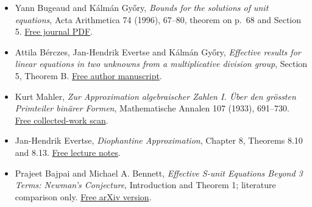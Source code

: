 \documentclass[
  11pt,
  a4paper,
]{article}
\providecommand{\tightlist}{%
  \setlength{\itemsep}{0pt}\setlength{\parskip}{0pt}}
\begin{document}
\begin{itemize}
\tightlist
\item
  Yann Bugeaud and Kálmán Győry, \emph{Bounds for the solutions of unit
  equations}, Acta Arithmetica 74 (1996), 67--80, theorem on p.~68 and
  Section 5.
  \href{https://matwbn.icm.edu.pl/ksiazki/aa/aa74/aa7416.pdf}{Free
  journal PDF}.
\item
  Attila Bérczes, Jan-Hendrik Evertse and Kálmán Győry, \emph{Effective
  results for linear equations in two unknowns from a multiplicative
  division group}, Section 5, Theorem B.
  \href{https://math.leidenuniv.nl/reports/files/2008-16.pdf}{Free
  author manuscript}.
\item
  Kurt Mahler, \emph{Zur Approximation algebraischer Zahlen I. Über den
  grössten Primteiler binärer Formen}, Mathematische Annalen 107 (1933),
  691--730.
  \href{https://carmamaths.org/resources/mahler/docs/017.pdf}{Free
  collected-work scan}.
\item
  Jan-Hendrik Evertse, \emph{Diophantine Approximation}, Chapter 8,
  Theorems 8.10 and 8.13.
  \href{https://pub.math.leidenuniv.nl/~evertsejh/dio19-8.pdf}{Free
  lecture notes}.
\item
  Prajeet Bajpai and Michael A. Bennett, \emph{Effective S-unit
  Equations Beyond 3 Terms: Newman's Conjecture}, Introduction and
  Theorem 1; literature comparison only.
  \href{https://arxiv.org/abs/2308.05162}{Free arXiv version}.
\end{itemize}
\end{document}
